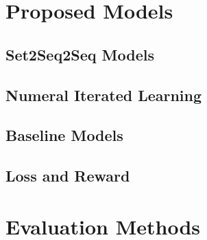 \section{Proposed Models}
\label{sec3.2:models}

\subsection{Set2Seq2Seq Models}
\label{ssec3.2.1:set2seq2seq}

\subsection{Numeral Iterated Learning}
\label{ssec3.2.2:3phase}

\subsection{Baseline Models}
\label{ssec3.2.3:baselines}

\subsection{Loss and Reward}
\label{ssec3.2.4:loss_reward}

\section{Evaluation Methods}
\label{sec3.3:evaluation}
